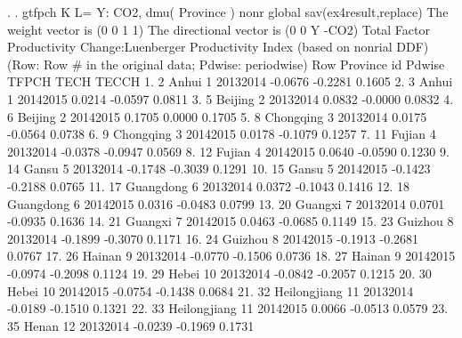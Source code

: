 . 
. gtfpch K L= Y: CO2, dmu( Province ) nonr  global sav(ex4result,replace)
{\smallskip}
 The weight vector is (0 0 1 1)
{\smallskip}
 The directional vector is (0 0 Y -CO2)
{\smallskip}
{\smallskip}
 Total Factor Productivity Change:Luenberger Productivity Index (based on nonrial DDF)
    (Row: Row \# in the original data; Pdwise: periodwise)
{\smallskip}
     {\TLC}
     {\VBAR} Row       Province   id      Pdwise     TFPCH      TECH    TECCH {\VBAR}
     {\LFTT}
  1. {\VBAR}   2          Anhui    1   2013{\tytilde}2014   -0.0676   -0.2281   0.1605 {\VBAR}
  2. {\VBAR}   3          Anhui    1   2014{\tytilde}2015    0.0214   -0.0597   0.0811 {\VBAR}
  3. {\VBAR}   5        Beijing    2   2013{\tytilde}2014    0.0832   -0.0000   0.0832 {\VBAR}
  4. {\VBAR}   6        Beijing    2   2014{\tytilde}2015    0.1705    0.0000   0.1705 {\VBAR}
  5. {\VBAR}   8      Chongqing    3   2013{\tytilde}2014    0.0175   -0.0564   0.0738 {\VBAR}
  6. {\VBAR}   9      Chongqing    3   2014{\tytilde}2015    0.0178   -0.1079   0.1257 {\VBAR}
  7. {\VBAR}  11         Fujian    4   2013{\tytilde}2014   -0.0378   -0.0947   0.0569 {\VBAR}
  8. {\VBAR}  12         Fujian    4   2014{\tytilde}2015    0.0640   -0.0590   0.1230 {\VBAR}
  9. {\VBAR}  14          Gansu    5   2013{\tytilde}2014   -0.1748   -0.3039   0.1291 {\VBAR}
 10. {\VBAR}  15          Gansu    5   2014{\tytilde}2015   -0.1423   -0.2188   0.0765 {\VBAR}
 11. {\VBAR}  17      Guangdong    6   2013{\tytilde}2014    0.0372   -0.1043   0.1416 {\VBAR}
 12. {\VBAR}  18      Guangdong    6   2014{\tytilde}2015    0.0316   -0.0483   0.0799 {\VBAR}
 13. {\VBAR}  20        Guangxi    7   2013{\tytilde}2014    0.0701   -0.0935   0.1636 {\VBAR}
 14. {\VBAR}  21        Guangxi    7   2014{\tytilde}2015    0.0463   -0.0685   0.1149 {\VBAR}
 15. {\VBAR}  23        Guizhou    8   2013{\tytilde}2014   -0.1899   -0.3070   0.1171 {\VBAR}
 16. {\VBAR}  24        Guizhou    8   2014{\tytilde}2015   -0.1913   -0.2681   0.0767 {\VBAR}
 17. {\VBAR}  26         Hainan    9   2013{\tytilde}2014   -0.0770   -0.1506   0.0736 {\VBAR}
 18. {\VBAR}  27         Hainan    9   2014{\tytilde}2015   -0.0974   -0.2098   0.1124 {\VBAR}
 19. {\VBAR}  29          Hebei   10   2013{\tytilde}2014   -0.0842   -0.2057   0.1215 {\VBAR}
 20. {\VBAR}  30          Hebei   10   2014{\tytilde}2015   -0.0754   -0.1438   0.0684 {\VBAR}
 21. {\VBAR}  32   Heilongjiang   11   2013{\tytilde}2014   -0.0189   -0.1510   0.1321 {\VBAR}
 22. {\VBAR}  33   Heilongjiang   11   2014{\tytilde}2015    0.0066   -0.0513   0.0579 {\VBAR}
 23. {\VBAR}  35          Henan   12   2013{\tytilde}2014   -0.0239   -0.1969   0.1731 {\VBAR}
